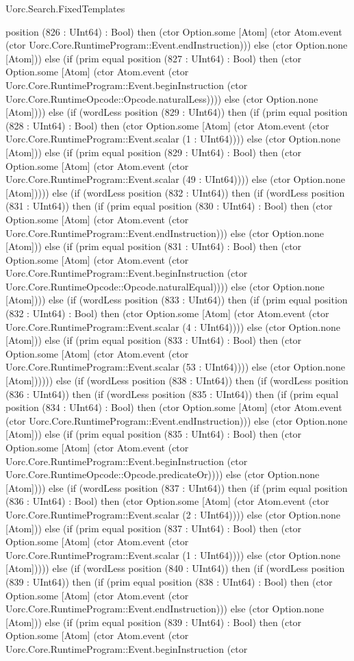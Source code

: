 \begin{lexlean}{Uorc.Search.FixedTemplates}
\begin{semanticmodule}
{position (826 : UInt64) : Bool) then (ctor Option.some [Atom] (ctor Atom.event (ctor Uorc.Core.RuntimeProgram::Event.endInstruction))) else (ctor Option.none [Atom])) else (if (prim equal position (827 : UInt64) : Bool) then (ctor Option.some [Atom] (ctor Atom.event (ctor Uorc.Core.RuntimeProgram::Event.beginInstruction (ctor Uorc.Core.RuntimeOpcode::Opcode.naturalLess)))) else (ctor Option.none [Atom]))) else (if (wordLess position (829 : UInt64)) then (if (prim equal position (828 : UInt64) : Bool) then (ctor Option.some [Atom] (ctor Atom.event (ctor Uorc.Core.RuntimeProgram::Event.scalar (1 : UInt64)))) else (ctor Option.none [Atom])) else (if (prim equal position (829 : UInt64) : Bool) then (ctor Option.some [Atom] (ctor Atom.event (ctor Uorc.Core.RuntimeProgram::Event.scalar (49 : UInt64)))) else (ctor Option.none [Atom])))) else (if (wordLess position (832 : UInt64)) then (if (wordLess position (831 : UInt64)) then (if (prim equal position (830 : UInt64) : Bool) then (ctor Option.some [Atom] (ctor Atom.event (ctor Uorc.Core.RuntimeProgram::Event.endInstruction))) else (ctor Option.none [Atom])) else (if (prim equal position (831 : UInt64) : Bool) then (ctor Option.some [Atom] (ctor Atom.event (ctor Uorc.Core.RuntimeProgram::Event.beginInstruction (ctor Uorc.Core.RuntimeOpcode::Opcode.naturalEqual)))) else (ctor Option.none [Atom]))) else (if (wordLess position (833 : UInt64)) then (if (prim equal position (832 : UInt64) : Bool) then (ctor Option.some [Atom] (ctor Atom.event (ctor Uorc.Core.RuntimeProgram::Event.scalar (4 : UInt64)))) else (ctor Option.none [Atom])) else (if (prim equal position (833 : UInt64) : Bool) then (ctor Option.some [Atom] (ctor Atom.event (ctor Uorc.Core.RuntimeProgram::Event.scalar (53 : UInt64)))) else (ctor Option.none [Atom]))))) else (if (wordLess position (838 : UInt64)) then (if (wordLess position (836 : UInt64)) then (if (wordLess position (835 : UInt64)) then (if (prim equal position (834 : UInt64) : Bool) then (ctor Option.some [Atom] (ctor Atom.event (ctor Uorc.Core.RuntimeProgram::Event.endInstruction))) else (ctor Option.none [Atom])) else (if (prim equal position (835 : UInt64) : Bool) then (ctor Option.some [Atom] (ctor Atom.event (ctor Uorc.Core.RuntimeProgram::Event.beginInstruction (ctor Uorc.Core.RuntimeOpcode::Opcode.predicateOr)))) else (ctor Option.none [Atom]))) else (if (wordLess position (837 : UInt64)) then (if (prim equal position (836 : UInt64) : Bool) then (ctor Option.some [Atom] (ctor Atom.event (ctor Uorc.Core.RuntimeProgram::Event.scalar (2 : UInt64)))) else (ctor Option.none [Atom])) else (if (prim equal position (837 : UInt64) : Bool) then (ctor Option.some [Atom] (ctor Atom.event (ctor Uorc.Core.RuntimeProgram::Event.scalar (1 : UInt64)))) else (ctor Option.none [Atom])))) else (if (wordLess position (840 : UInt64)) then (if (wordLess position (839 : UInt64)) then (if (prim equal position (838 : UInt64) : Bool) then (ctor Option.some [Atom] (ctor Atom.event (ctor Uorc.Core.RuntimeProgram::Event.endInstruction))) else (ctor Option.none [Atom])) else (if (prim equal position (839 : UInt64) : Bool) then (ctor Option.some [Atom] (ctor Atom.event (ctor Uorc.Core.RuntimeProgram::Event.beginInstruction (ctor }
\end{semanticmodule}
\end{lexlean}
